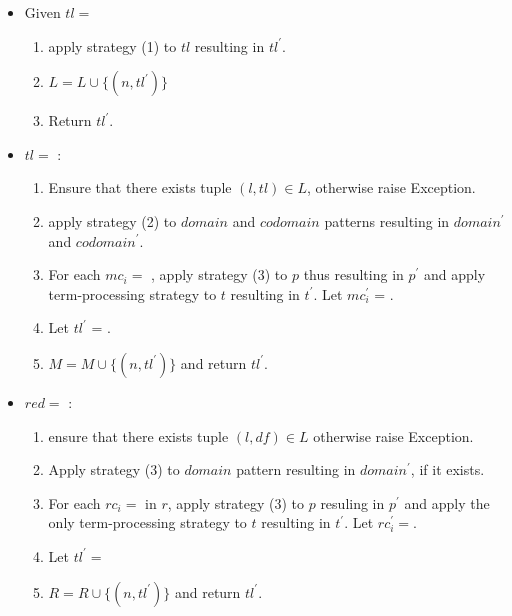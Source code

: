 \begin{itemize}
\item
Given $tl=$\TlDefineLanguage 
	\begin{enumerate}
		\item apply strategy (1) to $tl$ resulting in $tl^{\prime}$.
		\item $L = L \cup \{ (n, tl^{\prime}) \}$
		\item Return $tl^{\prime}$.
	\end{enumerate}

\item $tl=$ \TlDefineMetafunction: 
	\begin{enumerate}
	\item Ensure that there exists tuple $(l, tl) \in L$, otherwise raise Exception.
	\item apply strategy (2) to $domain$ and $codomain$ patterns resulting in $domain^\prime$ and $codomain^\prime$.
	\item For each $mc_i=$ \MetafunctionCase, apply strategy (3) to $p$ thus resulting in $p^{\prime}$ and apply term-processing strategy to $t$ resulting in $t^{\prime}$. Let $mc_i^{\prime}$ = \MetafunctionCase[$p^{\prime}$][$t^{\prime}$].
	\item Let $tl^\prime$  = .
	\item $M = M \cup \{ (n, tl^\prime)\}$ and return $tl^\prime$. 
	\end{enumerate}

\item $red=$ \TlDefineReductionRelation: 
\begin{enumerate}
\item ensure that there exists tuple $(l, df) \in L$ otherwise raise Exception.
\item Apply strategy (3) to $domain$ pattern resulting in $domain^\prime$, if it exists.
\item For each $rc_i=$ \ReductionCase \space in $r$, apply strategy (3) to $p$ resuling in $p^{\prime}$ and apply the only term-processing strategy to $t$ resulting in $t^\prime$. Let $rc_i^\prime=$\ReductionCase[$p^{\prime}$][$t^{\prime}$][$n$][false].
\item Let $tl^\prime=$
\item $R = R \cup \{ (n, tl^\prime) \}$ and return $tl^\prime$. 

\end{enumerate}


\end{itemize}
